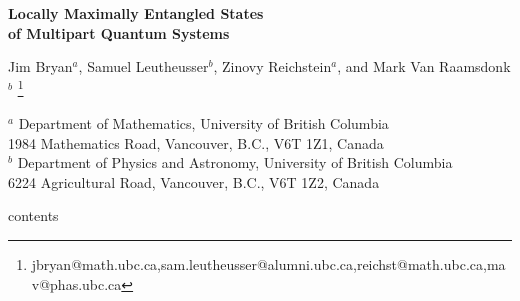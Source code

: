 \documentclass[12pt]{article}
\theoremstyle{definition}
\begin{document}
\begin{titlepage}
\hfill
\vbox{
    \halign{#\hfil         \cr
           } %
      }  %
\vspace*{20mm}
\begin{center}
{\Large \bf Locally Maximally Entangled States \\ of Multipart Quantum Systems}

\vspace*{15mm}
\vspace*{1mm}
Jim Bryan$^a$, Samuel Leutheusser$^b$, Zinovy Reichstein$^a$, and Mark Van Raamsdonk$^b$
\vspace*{1cm}
\let\thefootnote\relax\footnote{jbryan@math.ubc.ca,sam.leutheusser@alumni.ubc.ca,reichst@math.ubc.ca,mav@phas.ubc.ca}

{${}^{a}$ Department of Mathematics,
University of British Columbia\\
1984 Mathematics Road,
Vancouver, B.C., V6T 1Z1, Canada\\
${}^{b}$ Department of Physics and Astronomy,
University of British Columbia\\
6224 Agricultural Road,
Vancouver, B.C., V6T 1Z2, Canada}

\vspace*{1cm}
\end{center}
\begin{abstract}

For a multipart quantum system, a locally maximally entangled (LME)
state is one where each elementary subsystem is maximally entangled
with its complement, i.e. the reduced density matrix for each
elementary subsystem is a scalar multiple of the identity matrix. In this
paper, we give a complete description of multipart systems which admit
LME states by giving necessary and sufficient conditions on the
subsystem dimensions $(d_1, d_2, \dots, d_n)$. When the space of such
states is not empty, its quotient by local unitary transformations is
a (possibly singular) K\"ahler manifold that can be described as the
zero set of polynomials in weighted projective space.  This manifold is the space
of quantum states with ``generic'' entanglement up to SLOCC equivalence.
We determine the dimension of this space. We also give a general
construction for a special class of ``stabilizer'' LME states based on
the following observation: for any compact group $H$ (possibly finite) 
acting irreducibly on each subsystem, states invariant under
$H$ up to a phase are LME. Finally, for a tripartite system with
subsystems of dimensions $(2,A,B)$, we give an explicit construction
of all LME states.
\end{abstract}

\end{titlepage}
\tableof contents
\end{document}
